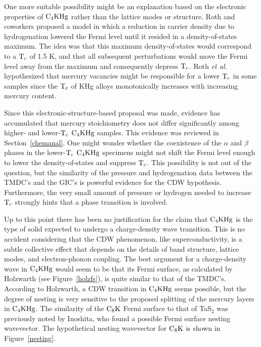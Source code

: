     One more suitable possibility  might be  an  explanation based   on the
electronic  properties of $\rm  C_4KHg$  rather than the  lattice modes  or
structure.  Roth   and coworkers\cite{H242}  proposed  a model  in  which a
reduction in carrier density  due to hydrogenation lowered the  Fermi level
until it  resided in a density-of-states  maximum.  The idea was  that this
maximum density-of-states would  correspond to a $\rm  T_c$  of 1.5 K,  and
that all subsequent perturbations would move the Fermi level away  from the
maximum and   consequently  depress   $\rm T_c$.   Roth  {\em    et  al.\/}
hypothesized that mercury vacancies might be  responsible for  a lower $\rm
T_c$ in some samples   since the $\rm T_c$   of  KHg alloys   monotonically
increases with increasing mercury content.\cite{roberts76}

        Since  this electronic-structure-based proposal  was made, evidence
has accumulated that mercury stoichiometry  does not  differ  significantly
among higher- and lower-$\rm T_c$ $\rm C_4KHg$ samples.  This evidence was reviewed
in Section~\ref{chemanal}.  One might wonder whether the coexistence of the
$\alpha$ and  $\beta$ phases in  the lower-$\rm T_c$ $\rm C_4KHg$ specimens
might not shift the Fermi level  enough to  lower the density-of-states and
suppress $\rm T_c$.   This possibility is not  out of the question, but the
similarity of the pressure and  hydrogenation data between  the  TMDC's and
the GIC's is  powerful  evidence for the  CDW hypothesis.  Furthermore,  the
very small  amount of  pressure  or hydrogen needed  to  increase $\rm T_c$
strongly hints that a phase transition is involved.

        Up to this point there has been no justification for the claim that
$\rm C_4KHg$ is the type of solid expected to undergo a charge-density wave
transition.  This is no accident  considering that the CDW phenomenon, like
superconductivity, is  a subtle   collective  effect that  depends on   the
details of  band structure,  lattice  modes,  and electron-phonon coupling.
The best argument for a charge-density wave in  $\rm C_4KHg$ would  seem to
be  that its  Fermi  surface, as  calculated by Holzwarth\cite{holzwarth88}
(see  Figure~\ref{holzfs}),  is  quite   similar to  that of   the  TMDC's.
According to  Holzwarth,  a CDW transition in  $\rm C_4KHg$ seems possible,
but    the   degree  of  nesting   is   very   sensitive to  the   proposed
splitting\cite{elmakrini80}    of      the  mercury    layers    in    $\rm
C_4KHg$.\cite{holzwarth88a} The similarity  of the $\rm C_8K$ Fermi surface
to that of  TaS$_2$ was  previously noted by Inoshita,\cite{inoshita77} who
found  a possible  Fermi   surface nesting  wavevector.   The  hypothetical
nesting wavevector for $\rm C_8K$ is shown in Figure~\ref{nesting}.

